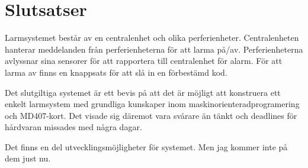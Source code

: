 \documentclass[a4paper]{article}
\begin{document}

\section{Slutsatser}
Larmsystemet består av en centralenhet och olika perferienheter. Centralenheten hanterar meddelanden från perferienheterna för att larma på/av. Perferienheterna avlyssnar sina sensorer för att rapportera till centralenhet för alarm. För att larma av finns en knappsats för att slå in en förbestämd kod.



Det slutgiltiga systemet är ett bevis på att det är möjligt att konstruera ett enkelt larmsystem med grundliga kunskaper inom maskinorienteradprogramering och MD407-kort. Det visade sig däremot vara svårare än tänkt och deadlines för hårdvaran missades med några dagar.

Det finns en del utvecklingsmöjligheter för systemet. Men jag kommer inte på dem just nu.




\end{document}
